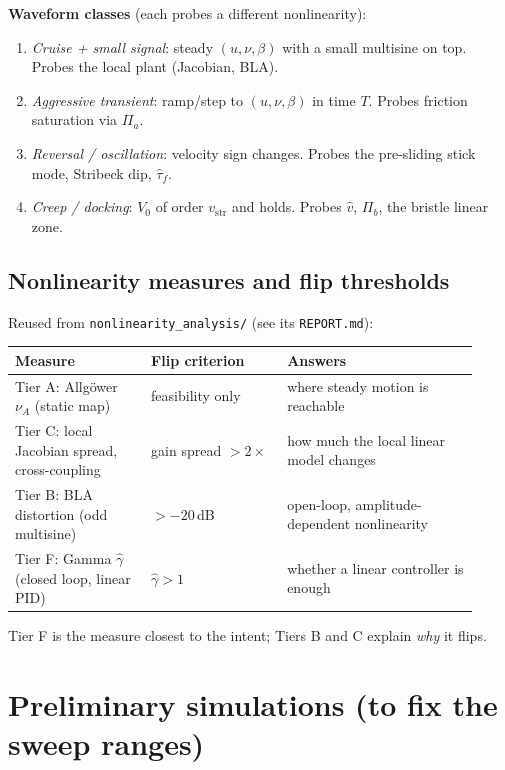 \documentclass[11pt]{article}
\begin{document}
\medskip
\textbf{Waveform classes} (each probes a different nonlinearity):
\begin{enumerate}[leftmargin=*,itemsep=2pt]
  \item \emph{Cruise + small signal}: steady $(u,\nu,\beta)$ with a small multisine
    on top. Probes the local plant (Jacobian, BLA).
  \item \emph{Aggressive transient}: ramp/step to $(u,\nu,\beta)$ in time $T$.
    Probes friction saturation via $\Pi_a$.
  \item \emph{Reversal / oscillation}: velocity sign changes. Probes the
    pre-sliding stick mode, Stribeck dip, $\hat\tau_f$.
  \item \emph{Creep / docking}: $V_0$ of order $v_{\mathrm{str}}$ and holds.
    Probes $\hat v$, $\Pi_b$, the bristle linear zone.
\end{enumerate}

\subsection{Nonlinearity measures and flip thresholds}
Reused from \texttt{nonlinearity\_analysis/} (see its \texttt{REPORT.md}):

\medskip
\begin{tabular}{@{}p{0.27\linewidth}p{0.27\linewidth}p{0.38\linewidth}@{}}
\toprule
Measure & Flip criterion & Answers \\
\midrule
Tier A: Allgöwer $\nu_A$ (static map) & feasibility only & where steady motion is reachable \\
Tier C: local Jacobian spread, cross-coupling & gain spread $> 2\times$ & how much the local linear model changes \\
Tier B: BLA distortion (odd multisine) & $> -20$\,dB & open-loop, amplitude-dependent nonlinearity \\
Tier F: Gamma $\hat\gamma$ (closed loop, linear PID) & $\hat\gamma > 1$ & whether a linear controller is enough \\
\bottomrule
\end{tabular}

\medskip
Tier F is the measure closest to the intent; Tiers B and C explain \emph{why} it
flips.

\section{Preliminary simulations (to fix the sweep ranges)}
\end{document}
